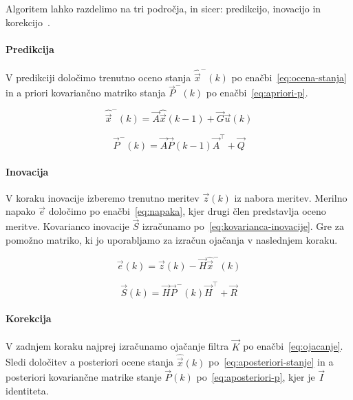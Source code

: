 Algoritem lahko razdelimo na tri področja, in sicer: predikcijo, inovacijo in korekcijo~\cite{trucco1998introductory}.

\paragraph{Predikcija}
V predikciji določimo trenutno oceno stanja $\hat{\vec{x}}^-(k)$ po enačbi~\eqref{eq:ocena-stanja} in a priori kovariančno matriko stanja $\vec{P}^-(k)$ po enačbi~\eqref{eq:apriori-p}.

\begin{equation}
	\hat{\vec{x}}^-(k) = \vec{A} \hat{\vec{x}}(k-1) + \vec{G} \vec{u}(k)
    \label{eq:ocena-stanja}
\end{equation}

\begin{equation}
	\vec{P}^-(k) = \vec{A} \vec{P}(k-1) \vec{A}^\top + \vec{Q}
    \label{eq:apriori-p}
\end{equation}

\paragraph{Inovacija}
V koraku inovacije izberemo trenutno meritev $\vec{z}(k)$ iz nabora meritev. Merilno napako $\vec{e}$ določimo po enačbi~\eqref{eq:napaka}, kjer drugi člen predstavlja oceno meritve. Kovarianco inovacije $\vec{S}$ izračunamo po~\eqref{eq:kovarianca-inovacije}. Gre za pomožno matriko, ki jo uporabljamo za izračun ojačanja v naslednjem koraku.

\begin{equation}
	\vec{e}(k) = \vec{z}(k) - \vec{H} \hat{\vec{x}}^-(k)
    \label{eq:napaka}
\end{equation}

\begin{equation}
\vec{S}(k) = \vec{H} \vec{P}^-(k) \vec{H}^\top + \vec{R}
\label{eq:kovarianca-inovacije}
\end{equation}

\paragraph{Korekcija}
V zadnjem koraku najprej izračunamo ojačanje filtra $\vec{K}$ po enačbi~\eqref{eq:ojacanje}. Sledi določitev a posteriori ocene stanja $\hat{\vec{x}}(k)$ po~\eqref{eq:aposteriori-stanje} in a posteriori kovariančne matrike stanje $\vec{P}(k)$ po~\eqref{eq:aposteriori-p}, kjer je $\vec{I}$ identiteta.

